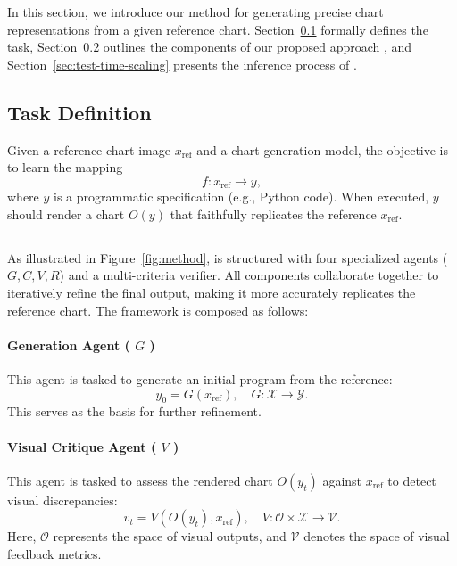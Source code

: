 

In this section, we introduce our method for generating precise chart representations from a given reference chart. Section~\ref{sec:task_definition} formally defines the task, Section~\ref{sec:multi_agents_system} outlines the components of our proposed approach \model{}, and Section~\ref{sec:test-time-scaling} presents the inference process of \model{}.

\subsection{Task Definition}
\label{sec:task_definition}
Given a reference chart image \(x_{\text{ref}}\) and a chart generation model, the objective is to learn the mapping
\[
    f: x_{\text{ref}} \to y,
\]
where \(y\) is a programmatic specification (e.g., Python code). When executed, \(y\) should render a chart \(O(y)\) that faithfully replicates the reference \(x_{\text{ref}}\).


\subsection{\model{}}
\label{sec:multi_agents_system}


As illustrated in Figure~\ref{fig:method}, \model{} is structured with four specialized agents  (\(G, C, V, R\)) and a multi-criteria verifier. 
All components collaborate together to iteratively refine the final output, making it more accurately replicates the reference chart. The framework is composed as follows:

\paragraph{\textbf{Generation Agent ( \(G\) )}}  
This agent is tasked to generate an initial program from the reference:
\[
    y_0 = G(x_{\text{ref}}), \quad G: \mathcal{X} \to \mathcal{Y}.
\]
This serves as the basis for further refinement.

\paragraph{\textbf{Visual Critique Agent ( \(V\) )}}  
This agent is tasked to assess the rendered chart \(O(y_t)\) against \(x_{\text{ref}}\) to detect visual discrepancies:
\[
    v_t = V(O(y_t), x_{\text{ref}}), \quad V: \mathcal{O} \times \mathcal{X} \to \mathcal{V}.
\]
Here, \(\mathcal{O}\) represents the space of visual outputs, and \(\mathcal{V}\) denotes the space of visual feedback metrics.

